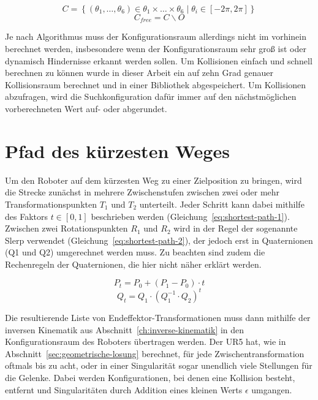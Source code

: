 \begin{equation}
    \mathit{C} = \left\{ \left( \theta_1,\dots,\theta_6 \right) \in \theta_1\times\dots\times\theta_6 \mid \theta_i \in \left[ -2\pi, 2\pi \right]\right\}
    \label{eq:config-1}
\end{equation}
\begin{equation}
    \mathit{C}_{free} = \mathit{C}\backslash\mathit{O}
    \label{eq:config-2}
\end{equation}

Je nach Algorithmus muss der Konfigurationsraum allerdings nicht im vorhinein berechnet werden, insbesondere wenn der Konfigurationsraum sehr groß ist oder dynamisch Hindernisse erkannt werden sollen.
Um Kollisionen einfach und schnell berechnen zu können wurde in dieser Arbeit ein auf zehn Grad genauer Kollisionsraum berechnet und in einer Bibliothek abgespeichert.
Um Kollisionen abzufragen, wird die Suchkonfiguration dafür immer auf den nächstmöglichen vorberechneten Wert auf- oder abgerundet.


\section{Pfad des kürzesten Weges}\label{sec:kurzesterweg}

Um den Roboter auf dem kürzesten Weg zu einer Zielposition zu bringen, wird die Strecke zunächst in mehrere Zwischenstufen zwischen zwei oder mehr Transformationspunkten $T_1$ und $T_2$ unterteilt.
Jeder Schritt kann dabei mithilfe des Faktors $t \in \left[0,1\right]$ beschrieben werden (Gleichung~\ref{eq:shortest-path-1}).
Zwischen zwei Rotationspunkten $R_1$ und $R_2$  wird in der Regel der sogenannte Slerp verwendet  (Gleichung~\ref{eq:shortest-path-2}), der jedoch erst in Quaternionen (Q1 und Q2) umgerechnet werden muss.
Zu beachten sind zudem die Rechenregeln der Quaternionen, die hier nicht näher erklärt werden.

\begin{equation}
    P_{t} = P_0 + \left( P_1 - P_0 \right) \cdot t
    \label{eq:shortest-path-1}
\end{equation}
\begin{equation}
    Q_{t} = Q_1 \cdot \left( Q_1^{-1} \cdot Q_2 \right)^t
    \label{eq:shortest-path-2}
\end{equation}

Die resultierende Liste von Endeffektor-Transformationen muss dann mithilfe der inversen Kinematik aus Abschnitt~\ref{ch:inverse-kinematik} in den Konfigurationsraum des Roboters übertragen werden.
Der UR5 hat, wie in Abschnitt~\ref{sec:geometrische-losung} berechnet, für jede Zwischentransformation oftmals bis zu acht, oder in einer Singularität sogar unendlich viele Stellungen für die Gelenke.
Dabei werden Konfigurationen, bei denen eine Kollision besteht, entfernt und Singularitäten durch Addition eines kleinen Werts $\epsilon$ umgangen.

